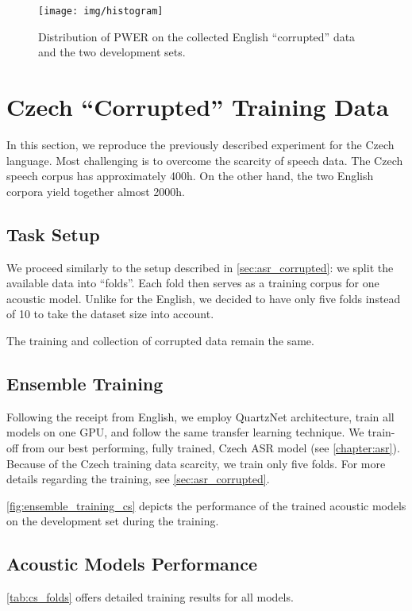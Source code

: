 \begin{figure}[t]
	\texttt{[image: img/histogram]}
	\caption[PWER distribution of collected English data]{Distribution of PWER on the collected English ``corrupted'' data and the two development sets.}
	\label{fig:histogram}
\end{figure}









\section{Czech ``Corrupted'' Training Data}
\label{sec:asr_corrupted_cs}
In this section, we reproduce the previously described experiment for the Czech language. Most challenging is to overcome the scarcity of speech data. The Czech speech corpus has approximately 400h. On the other hand, the two English corpora yield together almost 2000h.

\subsection{Task Setup}
We proceed similarly to the setup described in \cref{sec:asr_corrupted}: we split the available data into ``folds''. Each fold then serves as a training corpus for one acoustic model. Unlike for the English, we decided to have only five folds instead of 10 to take the dataset size into account.

The training and collection of corrupted data remain the same.

\subsection{Ensemble Training}
Following the receipt from English, we employ QuartzNet architecture, train all models on one GPU, and follow the same transfer learning technique. We train-off from our best performing, fully trained, Czech ASR model (see \cref{chapter:asr}). Because of the Czech training data scarcity, we train only five folds. For more details regarding the training, see \cref{sec:asr_corrupted}.

\cref{fig:ensemble_training_cs} depicts the performance of the trained acoustic models on the development set during the training.

\subsection{Acoustic Models Performance}
\cref{tab:cs_folds} offers detailed training results for all models. 

